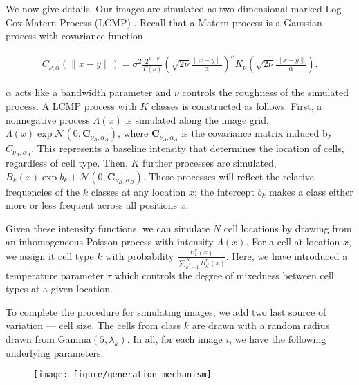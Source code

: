 We now give details. Our images are simulated as two-dimensional marked Log Cox
Matern Process (LCMP) \cite{diggle2013}. Recall that a Matern process is a
Gaussian process with covariance function

\begin{align*}
C_{\nu, \alpha}(\|x - y\|)=\sigma^{2} \frac{2^{1-\nu}}{\Gamma(\nu)}\left(\sqrt{2 \nu} \frac{\|x - y\|}{\alpha}\right)^{\nu} K_{\nu}\left(\sqrt{2 \nu} \frac{\|x - y\|}{\alpha}\right).
\end{align*}

$\alpha$ acts like a bandwidth parameter and $\nu$ controls the roughness of the
simulated process. A LCMP process with $K$ classes is constructed as follows.
First, a nonnegative process $\Lambda\left(x\right)$ is simulated along the
image grid, $\Lambda\left(x\right) \exp{\mathcal{N}\left(0,
  \mathbf{C}_{\nu_{\Lambda}, \alpha_{\Lambda}}\right)}$, where
$\mathbf{C}_{\nu_{\Lambda}, \alpha_{\Lambda}}$ is the covariance matrix induced
by $C_{\nu_{\Lambda}, \alpha_{\Lambda}}$. This represents a baseline intensity
that determines the location of cells, regardless of cell type. Then, $K$
further processes are simulated, $B_{k}\left(x\right) \exp{b_{k} +
  \mathcal{N}\left(0, \mathbf{C}_{\nu_{B}, \alpha_{B}}\right)} $. These
processes will reflect the relative frequencies of the $k$ classes at any
location $x$; the intercept $b_k$ makes a class either more or less frequent
across all positions $x$.

Given these intensity functions, we can simulate $N$ cell locations by drawing
from an inhomogeneous Poisson process with intensity $\Lambda\left(x\right)$.
For a cell at location $x$, we assign it cell type $k$ with probability
$\frac{B_{k}^{\tau}\left(x\right)}{\sum_{k^\prime = 1}^{K}
  B^{\tau}_{k^\prime}\left(x\right)}$. Here, we have introduced a temperature
parameter $\tau$ which controls the degree of mixedness between cell types at a
given location.

To complete the procedure for simulating images, we add two last source of
variation — cell size. The cells from class $k$ are drawn with a random radius
drawn from $\text{Gamma}\left(5, \lambda_{k}\right)$. In all, for each image
$i$, we have the following underlying parameters,

\begin{figure}
  \centering
  \texttt{[image: figure/generation\_mechanism]}
\end{figure}

